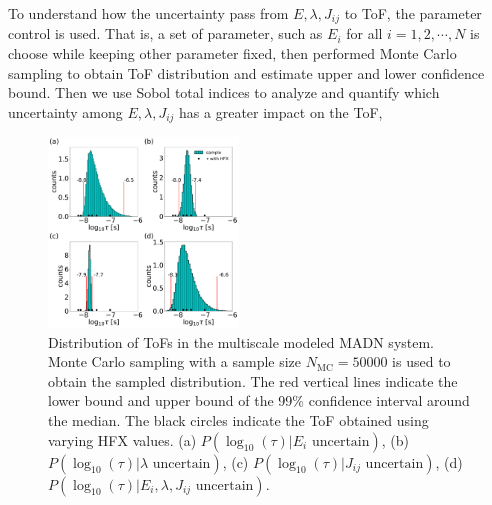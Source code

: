 \documentclass[%
 reprint,
superscriptaddress,
 amsmath,amssymb,
 aps,
prb,
floatfix
]{revtex4-2}
\begin{document}
To understand how the uncertainty pass from $E, \lambda, J_{ij}$ to ToF, the parameter control is used. That is, a set of parameter, such as $E_i$ for all $i=1,2,\cdots,N$ is choose while keeping other parameter fixed, then performed Monte Carlo sampling to obtain ToF distribution and estimate upper and lower confidence bound.
Then we use Sobol total indices to analyze and quantify 
which uncertainty among $E, \lambda, J_{ij}$ has a greater impact on the ToF, 

%
\begin{figure}
  \centering
  \includegraphics[width=0.45\textwidth]{figs/fig_mle_MADN_withE.pdf}
  \caption{Distribution of ToFs in the multiscale modeled MADN system.
  Monte Carlo sampling with a sample size $N_\text{MC}=50000$ is used to obtain the sampled distribution. The red vertical lines indicate the lower bound and upper bound of the 99\% confidence interval around the median.
  The black circles indicate the ToF obtained using varying HFX values.
  (a) $P(\log_{10}(\tau)|E_i \text{ uncertain})$, 
  (b) $P(\log_{10}(\tau)|\lambda \text{ uncertain})$, 
  (c) $P(\log_{10}(\tau)|J_{ij} \text{ uncertain})$, 
  (d) $P(\log_{10}(\tau)|E_i, \lambda, J_{ij} \text{ uncertain})$. }
  \label{fig:mle_MADN_withE}
\end{figure}
%
\end{document}
